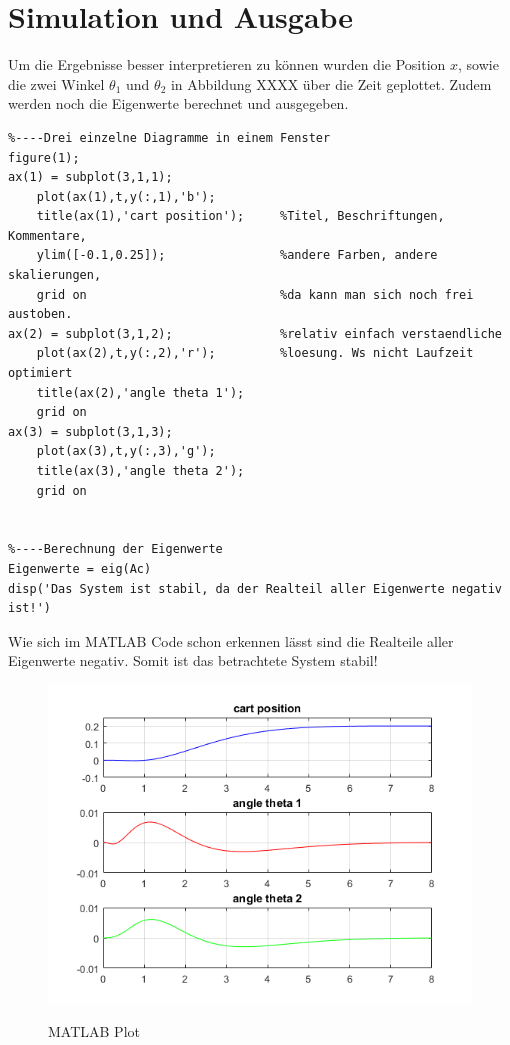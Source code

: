 \documentclass[a4paper, 10pt]{report}
\begin{document}
\section{Simulation und Ausgabe}
Um die Ergebnisse besser interpretieren zu können wurden die Position $x$, sowie die zwei Winkel $\theta_{1}$ und $\theta_{2}$ in Abbildung XXXX über die Zeit geplottet. Zudem werden noch die Eigenwerte berechnet und ausgegeben.  
\begin{lstlisting}
%----Drei einzelne Diagramme in einem Fenster
figure(1);
ax(1) = subplot(3,1,1);
    plot(ax(1),t,y(:,1),'b');
    title(ax(1),'cart position');     %Titel, Beschriftungen, Kommentare,
    ylim([-0.1,0.25]);                %andere Farben, andere skalierungen,
    grid on                           %da kann man sich noch frei austoben.
ax(2) = subplot(3,1,2);               %relativ einfach verstaendliche 
    plot(ax(2),t,y(:,2),'r');         %loesung. Ws nicht Laufzeit optimiert
    title(ax(2),'angle theta 1');
    grid on
ax(3) = subplot(3,1,3);
    plot(ax(3),t,y(:,3),'g');
    title(ax(3),'angle theta 2');
    grid on


%----Berechnung der Eigenwerte
Eigenwerte = eig(Ac)
disp('Das System ist stabil, da der Realteil aller Eigenwerte negativ ist!')

\end{lstlisting}
Wie sich im MATLAB Code schon erkennen lässt sind die Realteile aller Eigenwerte negativ. Somit ist das betrachtete System stabil!

\begin{figure}[h]
\centering  %
{\includegraphics[width=15cm]{AusgabeMATLAB}}
\caption{MATLAB Plot}
\end{figure}
\end{document}
